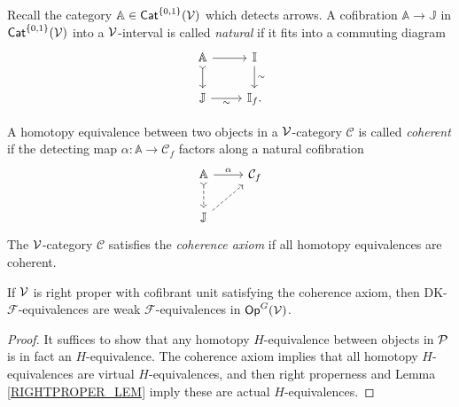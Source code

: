 \documentclass[a4paper,10pt
,draft
]{article}%
\renewcommand{\F}{\mathcal F}
\newcommand{\I}{\mathbb I}
\newcommand{\J}{\mathbb J}
\renewcommand{\1}{\ensuremath{\mathbb{id}}}
\begin{document}
\begin{definition}
      Recall the category $\mathbb A \in \Cat^{\set{0,1}}(\V)$ which detects arrows.
      A cofibration $\mathbb A \to \J$ in $\Cat^{\set{0,1}}(\V)$ into a $\V$-interval is called \textit{natural} if
      it fits into a commuting diagram
      \begin{equation}
            \begin{tikzcd}
                  \mathbb A \arrow[d, tail] \arrow[r]
                  &
                  \I \arrow[d, "\sim"]
                  \\
                  \J \arrow[r, "\sim"']
                  &
                  \I_f.
            \end{tikzcd}
      \end{equation}

      A homotopy equivalence between two objects in a $\V$-category $\mathcal C$ is called \textit{coherent} if
      the detecting map $\alpha: \mathbb A \to \mathcal C_f$ factors along a natural cofibration
      \begin{equation}
            \begin{tikzcd}
                  \mathbb A \arrow[r, "\alpha"] \arrow[d, tail, dashed]
                  &
                  \mathcal C_f
                  \\
                  \J \arrow[ur, dashed]
            \end{tikzcd}
      \end{equation}
      The $\V$-category $\mathcal C$ satisfies the \textit{coherence axiom} if all homotopy equivalences are coherent.
\end{definition}

\begin{proposition}
      If $\V$ is right proper with cofibrant unit satisfying the coherence axiom, then
      DK-$\F$-equivalences are weak $\F$-equivalences in $\Op^G(\V)$.
\end{proposition}
\begin{proof}
      It suffices to show that any homotopy $H$-equivalence between objects in $\P$ is in fact an $H$-equivalence.
      The coherence axiom implies that all homotopy $H$-equivalences are virtual $H$-equivalences, and then
      right properness and Lemma \ref{RIGHTPROPER_LEM} imply these are actual $H$-equivalences.
\end{proof}




\end{document}
